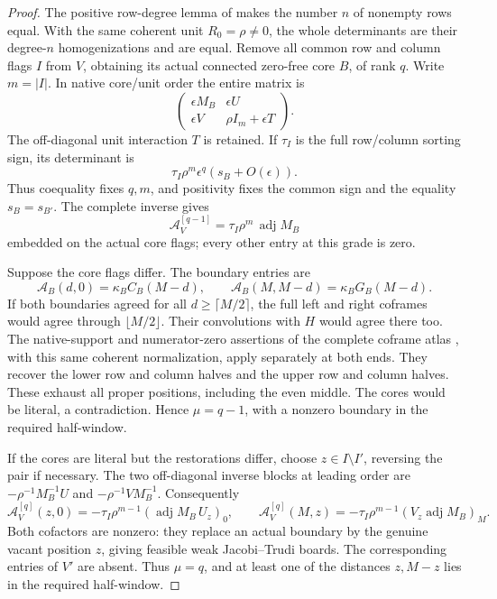 \documentclass[11pt,a4paper]{amsart}
\numberwithin{equation}{section}
\theoremstyle{plain}
\theoremstyle{definition}
\begin{document}
\begin{proof}
The positive row-degree lemma of \cite{Shields2026Coframes} makes the
number \(n\) of nonempty rows equal.  With the same coherent unit
\(R_0=\rho\ne0\), the whole determinants are their degree-\(n\)
homogenizations and are equal.  Remove all common row and column flags
\(I\) from \(V\),
obtaining its actual connected zero-free core \(B\), of rank \(q\).
Write \(m=|I|\).  In native core/unit order the entire matrix is
\[
 \begin{pmatrix}\epsilon M_B&\epsilon U\\
                 \epsilon V&\rho I_m+\epsilon T\end{pmatrix}.
\]
The off-diagonal unit interaction \(T\) is retained.  If \(\tau_I\)
is the full row/column sorting sign, its determinant is
\[
 \tau_I\rho^m\epsilon^q(s_B+O(\epsilon)).
\]
Thus coequality fixes \(q,m\), and positivity fixes the common sign
and the equality \(s_B=s_{B'}\).  The complete inverse gives
\[
 \mathcal A_V^{[q-1]}
 =\tau_I\rho^m\,\operatorname{adj}M_B
\]
embedded on the actual core flags; every other entry at this grade is
zero.

Suppose the core flags differ.  The boundary entries are
\[
 \mathcal A_B(d,0)=\kappa_B C_B(M-d),\qquad
 \mathcal A_B(M,M-d)=\kappa_B G_B(M-d).
\]
If both boundaries agreed for all \(d\ge\lceil M/2\rceil\), the full
left and right coframes would agree through \(\lfloor M/2\rfloor\).
Their convolutions with \(H\) would agree there too.
The native-support and numerator-zero assertions of the complete
coframe atlas \cite{Shields2026Coframes}, with this same coherent
normalization, apply separately at both ends.  They recover the lower
row and column halves and the upper row and column halves.  These
exhaust all proper positions, including the even middle.
The cores would be literal, a contradiction.  Hence
\(\mu=q-1\), with a nonzero boundary in the required half-window.

If the cores are literal but the restorations differ, choose
\(z\in I\setminus I'\), reversing the pair if necessary.  The two
off-diagonal inverse blocks at leading order are
\(-\rho^{-1}M_B^{-1}U\) and \(-\rho^{-1}VM_B^{-1}\).
Consequently
\[
 \mathcal A_V^{[q]}(z,0)
   =-\tau_I\rho^{m-1}(\operatorname{adj}M_B\,U_z)_0,\qquad
 \mathcal A_V^{[q]}(M,z)
   =-\tau_I\rho^{m-1}(V_z\operatorname{adj}M_B)_M.
\]
Both cofactors are nonzero: they replace an actual boundary by the
genuine vacant position \(z\), giving feasible weak Jacobi--Trudi
boards.  The corresponding entries of \(V'\) are absent.  Thus
\(\mu=q\), and at least one of the distances \(z,M-z\) lies in the
required half-window.


\end{proof}
\end{document}
